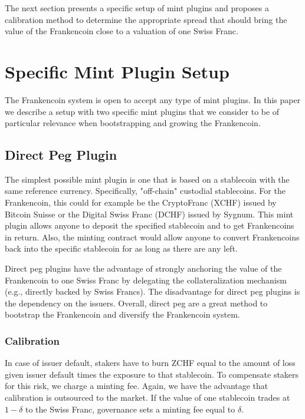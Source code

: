 \documentclass[english,11pt]{article}
\newcommand{\nothing}[1]{}
\begin{document}
The next section presents a specific setup of mint plugins and proposes
a calibration method to determine the appropriate spread that should
bring the value of the Frankencoin close to a valuation of one Swiss Franc. 

\section{Specific Mint Plugin Setup}
The Frankencoin system is open to accept any type of mint plugins. 
In this paper we describe a setup with two specific mint plugins that 
we consider to be of particular relevance when bootstrapping and growing the Frankencoin.

\subsection{Direct Peg Plugin}
The simplest possible mint plugin is one that is based on a stablecoin with the same reference currency. Specifically, "off-chain" custodial stablecoins. For the Frankencoin, this could for example be the CryptoFranc (XCHF) issued by Bitcoin Suisse or the Digital Swiss Franc (DCHF) issued by Sygnum. 
This mint plugin allows anyone to deposit the specified stablecoin and to get Frankencoins in return. Also, the minting contract would allow anyone to convert Frankencoins back into the specific stablecoin for as long as there are any left.

Direct peg plugins have the advantage of strongly anchoring the value of the Frankencoin to one Swiss Franc by delegating the collateralization mechanism
(e.g., directly backed by Swiss Francs).  
The disadvantage for direct peg plugins is the dependency on 
the issuers. Overall, direct peg are a great method to bootstrap 
the Frankencoin and diversify the Frankencoin system.

\subsubsection{Calibration}
In case of issuer default, stakers have to burn ZCHF equal to the amount of
loss given issuer default times the exposure to that stablecoin. 
To compensate stakers for this risk,
we charge a minting fee. Again, we have the advantage that 
calibration is outsourced to the market.
If the value of one stablecoin trades at $1-\delta$ to the Swiss Franc, governance
sets a minting fee equal to $\delta$.

\nothing{
To guard against default risk of an issuer, minting should be limited to the staked amount of Frankencoins in the governance contract. That way, the Frankencoin could absorb a total loss of value of one of the pegged stablecoins. In case of a loss of trust in the pegged stablecoin, it would be challenged in a vote of distrust the remaining coins auctioned off, with the stakers having to take a loss in case the auction does reach a 1:1 conversion rate.
}
\end{document}

